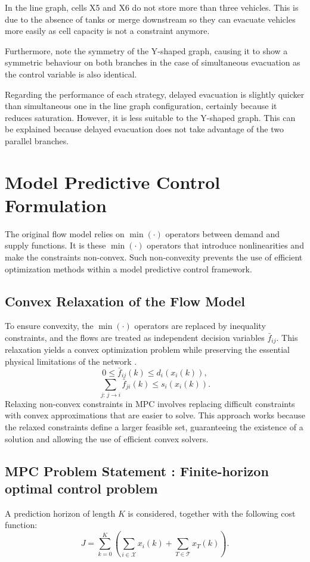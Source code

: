 \documentclass[12pt]{article}
\begin{document}
In the line graph, cells X5 and X6 do not store more than three vehicles. This is due to the absence of tanks or merge downstream so they can evacuate vehicles more easily as cell capacity is not a constraint anymore.

Furthermore, note the symmetry of the Y-shaped graph, causing it to show a symmetric behaviour on both branches in the case of simultaneous evacuation as the control variable is also identical.

Regarding the performance of each strategy, delayed evacuation is slightly quicker than simultaneous one in the line graph configuration, certainly because it reduces saturation. However, it is less suitable to the Y-shaped graph. This can be explained because delayed evacuation does not take advantage of the two parallel branches. 




\section{Model Predictive Control Formulation}
The original flow model relies on $\min(\cdot)$ operators between demand and supply functions. It is these $\min(\cdot)$ operators that introduce nonlinearities and make the constraints non-convex. Such non-convexity prevents the use of efficient optimization methods within a model predictive control framework. 


\subsection{Convex Relaxation of the Flow Model}
To ensure convexity, the $\min(\cdot)$ operators are replaced by inequality constraints, and the flows are treated as independent decision variables $\bar{f}_{ij}$. This relaxation yields a convex optimization problem while preserving the essential physical limitations of the network \cite{ref4}.
\[
0 \le \bar{f}_{ij}(k) \le d_i(x_i(k)),
\]
\[
\sum_{j:\,j \to i} \bar{f}_{ji}(k) \le s_i(x_i(k)).
\]
Relaxing non-convex constraints in MPC involves replacing difficult constraints with convex approximations that are easier to solve. This approach works because the relaxed constraints define a larger feasible set, guaranteeing the existence of a solution and allowing the use of efficient convex solvers.



\subsection{MPC Problem Statement : Finite-horizon optimal control problem}
A prediction horizon of length $K$ is considered, together with the following cost function:
\[
J = \sum_{k=0}^{K} \left( \sum_{i \in \mathcal{X}} x_i(k) + \sum_{T \in \mathcal{T}} x_T(k) \right).
\]
\end{document}
